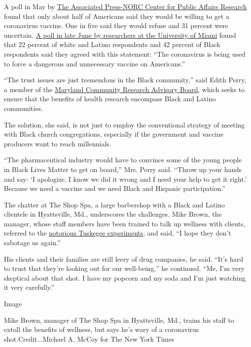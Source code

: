 A poll in May by
\href{https://apnews.com/dacdc8bc428dd4df6511bfa259cfec44}{The
Associated Press-NORC Center for Public Affairs Research} found that
only about half of Americans said they would be willing to get a
coronavirus vaccine. One in five said they would refuse and 31 percent
were uncertain.
\href{https://www.newsweek.com/will-black-americans-fear-vaccine-more-covid-19-opinion-1516087}{A
poll in late June by researchers at the University of Miami} found that
22 percent of white and Latino respondents and 42 percent of Black
respondents said they agreed with this statement: ``The coronavirus is
being used to force a dangerous and unnecessary vaccine on Americans.''

``The trust issues are just tremendous in the Black community,'' said
Edith Perry, a member of the
\href{https://sph.umd.edu/center/che/maryland-community-research-advisory-board-md-crab}{Maryland
Community Research Advisory Board}, which seeks to ensure that the
benefits of health research encompass Black and Latino communities.

The solution, she said, is not just to employ the conventional strategy
of meeting with Black church congregations, especially if the government
and vaccine producers want to reach millennials.

``The pharmaceutical industry would have to convince some of the young
people in Black Lives Matter to get on board,'' Mrs. Perry said. ``Throw
up your hands and say: `I apologize. I know we did it wrong and I need
your help to get it right.' Because we need a vaccine and we need Black
and Hispanic participation.''

The chatter at The Shop Spa, a large barbershop with a Black and Latino
clientele in Hyattsville, Md., underscores the challenges. Mike Brown,
the manager, whose staff members have been trained to talk up wellness
with clients, referred to the
\href{https://www.nytimes.com/1997/05/12/us/families-emerge-as-silent-victims-of-tuskegee-syphilis-experiment.html}{notorious
Tuskegee experiments}, and said, ``I hope they don't sabotage us
again.''

His clients and their families are still leery of drug companies, he
said. ``It's hard to trust that they're looking out for our
well-being,'' he continued. ``Me, I'm very skeptical about that shot. I
have my popcorn and my soda and I'm just watching it very carefully.''

Image

Mike Brown, manager of The Shop Spa in Hyattsville, Md., trains his
staff to extoll the benefits of wellness, but says he's wary of a
coronavirus shot.Credit...Michael A. McCoy for The New York Times

